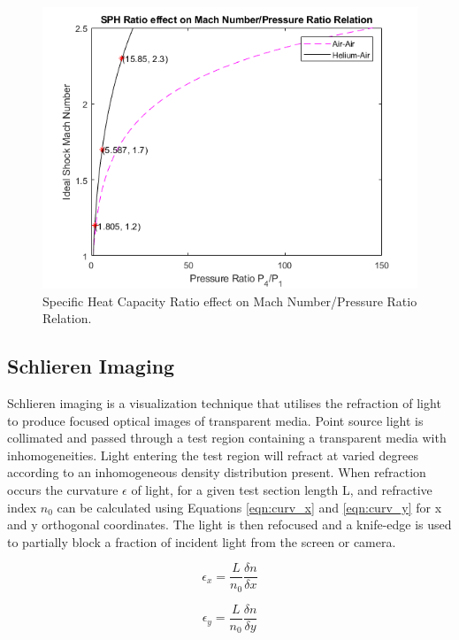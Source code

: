 \begin{figure}[H] 
	\centering
	\includegraphics[scale=0.9]{fig1.png} 
	\caption{Specific Heat Capacity Ratio effect on Mach Number/Pressure Ratio Relation.}
	\label{fig:gas_relation}
\end{figure}

\subsection{Schlieren Imaging}
Schlieren imaging is a visualization technique that utilises the refraction of light to produce focused optical images of transparent media. Point source light is collimated and passed through a test region containing a transparent media with inhomogeneities. Light entering the test region will refract at varied degrees according to an inhomogeneous density distribution present. When refraction occurs the curvature $\epsilon$ of light, for a given test section length L, and refractive index $n_0$ can be calculated using Equations \ref{eqn:curv_x} and \ref{eqn:curv_y} for x and y orthogonal coordinates. The light is then refocused and a knife-edge is used to partially block a fraction of incident light from the screen or camera.

\begin{equation}\label{eqn:curv_x}
\epsilon_x = \frac{L}{n_0}\frac{\delta n}{\delta x}
\end{equation}

\begin{equation}\label{eqn:curv_y}
\epsilon_y = \frac{L}{n_0}\frac{\delta n}{\delta y}
\end{equation}

